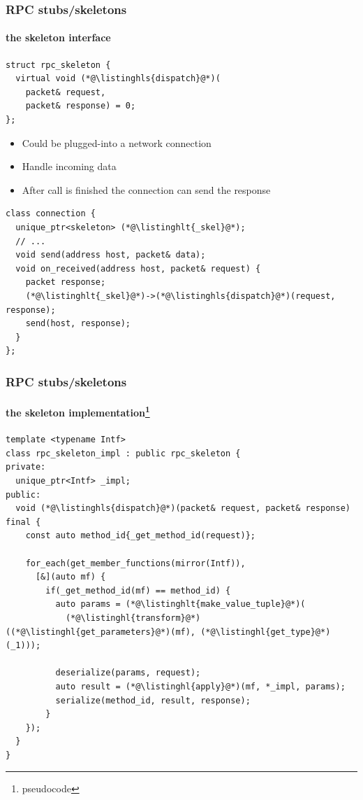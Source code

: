 \documentclass[compress,table,xcolor=table]{beamer}
\begin{document}
\begin{frame}[fragile]
  \frametitle{RPC stubs/skeletons}
  \framesubtitle{the skeleton interface}
  \begin{lstlisting}[language=c++2x,basicstyle=\scriptsize\ttfamily]
struct rpc_skeleton {
  virtual void (*@\listinghls{dispatch}@*)(
    packet& request,
    packet& response) = 0;
};
  \end{lstlisting}
  \begin{itemize}
    \item Could be plugged-into a network connection
    \item Handle incoming data
    \item After call is finished the connection can send the response
  \end{itemize}
  \begin{lstlisting}[language=c++2x,basicstyle=\scriptsize\ttfamily]
class connection {
  unique_ptr<skeleton> (*@\listinghlt{_skel}@*);
  // ...
  void send(address host, packet& data);
  void on_received(address host, packet& request) {
    packet response;
    (*@\listinghlt{_skel}@*)->(*@\listinghls{dispatch}@*)(request, response);
    send(host, response);
  }
};
  \end{lstlisting}
\end{frame}
\begin{frame}[fragile]
  \frametitle{RPC stubs/skeletons}
  \framesubtitle{the skeleton implementation\footnote{pseudocode}}
  \begin{lstlisting}[language=c++2x,basicstyle=\scriptsize\ttfamily]
template <typename Intf>
class rpc_skeleton_impl : public rpc_skeleton {
private:
  unique_ptr<Intf> _impl;
public:
  void (*@\listinghls{dispatch}@*)(packet& request, packet& response) final {
    const auto method_id{_get_method_id(request)};

    for_each(get_member_functions(mirror(Intf)),
      [&](auto mf) {
        if(_get_method_id(mf) == method_id) {
          auto params = (*@\listinghlt{make_value_tuple}@*)(
            (*@\listinghl{transform}@*)((*@\listinghl{get_parameters}@*)(mf), (*@\listinghl{get_type}@*)(_1)));

          deserialize(params, request);
          auto result = (*@\listinghl{apply}@*)(mf, *_impl, params);
          serialize(method_id, result, response);
        }
    });
  }
}
  \end{lstlisting}
\end{frame}
\end{document}

